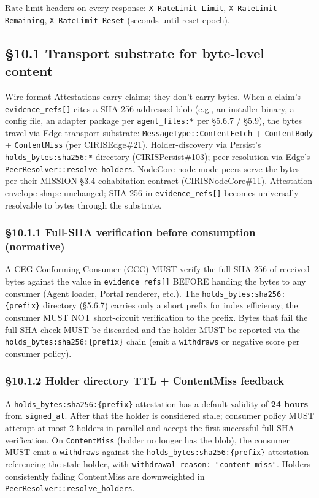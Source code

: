 \documentclass[11pt]{article}
\begin{document}
Rate-limit headers on every response: \texttt{X-RateLimit-Limit}, \texttt{X-RateLimit-Remaining}, \texttt{X-RateLimit-Reset} (seconds-until-reset epoch).


\subsection*{§10.1 Transport substrate for byte-level content}


Wire-format Attestations carry claims; they don't carry bytes. When a claim's \texttt{evidence\_refs[]} cites a SHA-256-addressed blob (e.g., an installer binary, a config file, an adapter package per \texttt{agent\_files:*} per §5.6.7 / §5.9), the bytes travel via Edge transport substrate: \texttt{MessageType::ContentFetch} + \texttt{ContentBody} + \texttt{ContentMiss} (per CIRISEdge\#21). Holder-discovery via Persist's \texttt{holds\_bytes:sha256:*} directory (CIRISPersist\#103); peer-resolution via Edge's \texttt{PeerResolver::resolve\_holders}. NodeCore node-mode peers serve the bytes per their MISSION §3.4 cohabitation contract (CIRISNodeCore\#11). Attestation envelope shape unchanged; SHA-256 in \texttt{evidence\_refs[]} becomes universally resolvable to bytes through the substrate.


\subsubsection*{§10.1.1 Full-SHA verification before consumption (normative)}


A CEG-Conforming Consumer (CCC) MUST verify the full SHA-256 of received bytes against the value in \texttt{evidence\_refs[]} BEFORE handing the bytes to any consumer (Agent loader, Portal renderer, etc.). The \texttt{holds\_bytes:sha256:\{prefix\}} directory (§5.6.7) carries only a short prefix for index efficiency; the consumer MUST NOT short-circuit verification to the prefix. Bytes that fail the full-SHA check MUST be discarded and the holder MUST be reported via the \texttt{holds\_bytes:sha256:\{prefix\}} chain (emit a \texttt{withdraws} or negative score per consumer policy).


\subsubsection*{§10.1.2 Holder directory TTL + ContentMiss feedback}


A \texttt{holds\_bytes:sha256:\{prefix\}} attestation has a default validity of \textbf{24 hours} from \texttt{signed\_at}. After that the holder is considered stale; consumer policy MUST attempt at most 2 holders in parallel and accept the first successful full-SHA verification. On \texttt{ContentMiss} (holder no longer has the blob), the consumer MUST emit a \texttt{withdraws} against the \texttt{holds\_bytes:sha256:\{prefix\}} attestation referencing the stale holder, with \texttt{withdrawal\_reason: "content\_miss"}. Holders consistently failing ContentMiss are downweighted in \texttt{PeerResolver::resolve\_holders}.
\end{document}
